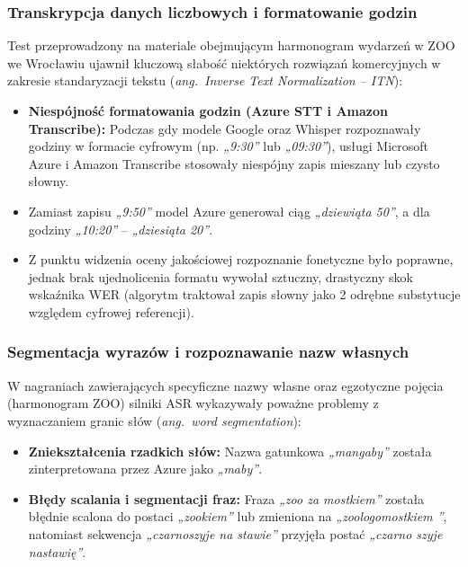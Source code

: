 \subsubsection{Transkrypcja danych liczbowych i formatowanie godzin}
\label{subsubsec:numeric_errors}

Test przeprowadzony na materiale obejmującym harmonogram wydarzeń w ZOO we Wrocławiu ujawnił kluczową słabość niektórych rozwiązań komercyjnych w zakresie standaryzacji tekstu (\textit{ang.~Inverse Text Normalization -- ITN}):

\begin{itemize}
    \item \textbf{Niespójność formatowania godzin (Azure STT i Amazon Transcribe):} Podczas gdy modele Google oraz Whisper rozpoznawały godziny w formacie cyfrowym (np. \textit{„9:30”} lub \textit{„09:30”}), usługi Microsoft Azure i Amazon Transcribe stosowały niespójny zapis mieszany lub czysto słowny. 
    \item Zamiast zapisu \textit{„9:50”} model Azure generował ciąg \textit{„dziewiąta 50”}, a dla godziny \textit{„10:20”} – \textit{„dziesiąta 20”}. 
    \item Z punktu widzenia oceny jakościowej rozpoznanie fonetyczne było poprawne, jednak brak ujednolicenia formatu wywołał sztuczny, drastyczny skok wskaźnika WER (algorytm traktował zapis słowny jako 2 odrębne substytucje względem cyfrowej referencji).
\end{itemize}

\subsubsection{Segmentacja wyrazów i rozpoznawanie nazw własnych}
\label{subsubsec:segmentation_errors}

W nagraniach zawierających specyficzne nazwy własne oraz egzotyczne pojęcia (harmonogram ZOO) silniki ASR wykazywały poważne problemy z wyznaczaniem granic słów (\textit{ang.~word segmentation}):

\begin{itemize}
    \item \textbf{Zniekształcenia rzadkich słów:} Nazwa gatunkowa \textit{„mangaby”} została zinterpretowana przez Azure jako \textit{„maby”}.
    \item \textbf{Błędy scalania i segmentacji fraz:} Fraza \textit{„zoo za mostkiem”} została błędnie scalona do postaci \textit{„zookiem”} lub zmieniona na \textit{„zoologomostkiem ”}, natomiast sekwencja \textit{„czarnoszyje na stawie”} przyjęła postać \textit{„czarno szyje nastawię”}.
\end{itemize}

